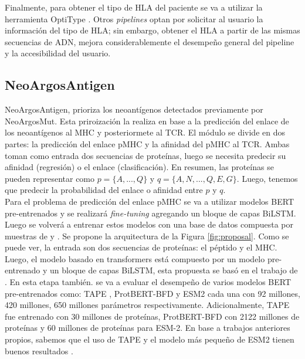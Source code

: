 \documentclass[a4paper]{article}
\begin{document}
Finalmente, para obtener el tipo de HLA del paciente se va a utilizar la herramienta OptiType \citep{szolek2014optitype}. Otros \textit{pipelines} optan por solicitar al usuario la información del tipo de HLA; sin embargo, obtener el HLA a partir de las mismas secuencias de ADN, mejora considerablemente el desempeño general del pipeline y la accesibilidad del usuario.




\subsection{NeoArgosAntigen}

NeoArgosAntigen, prioriza los neoantígenos detectados previamente por NeoArgosMut. Esta priroización la realiza en base a la predicción del enlace de los neoantígenos al MHC y posteriormete al TCR. El módulo se divide en dos partes: la predicción del enlace pMHC y la afinidad del pMHC al TCR. Ambas toman como entrada dos secuencias de proteínas, luego se necesita predecir su afinidad (regresión) o el enlace (clasificación). En resumen, las proteínas se pueden representar como $p = \{ A, ... , Q \}$ y $q = \{ A, N, ... ,Q, E, G \}$. Luego, tenemos que  predecir la probabilidad del enlace o afinidad entre $p$ y $q$. \\


Para el problema de predicción del enlace pMHC se va a utilizar modelos BERT pre-entrenados y se realizará \textit{fine-tuning} agregando un bloque de capas BiLSTM. Luego se volverá a entrenar estos modelos con una base de datos compuesta por muestras de \cite{zhang2022hlab} y \cite{gfeller2023improved}. Se propone la arquitectura de la Figura \ref{fig:proposal}. Como se puede ver, la entrada son dos secuencias de proteínas: el péptido y el MHC. Luego, el modelo basado en transformers está compuesto por un modelo pre-entrenado y un bloque de capas BiLSTM, esta propuesta se basó en el trabajo de \cite{zhang2022hlab}. En esta etapa también. se va a evaluar el desempeño de varios modelos BERT pre-entrenados como: TAPE \citep{rao2019evaluating}, ProtBERT-BFD \citep{elnaggar2021prottrans} y ESM2 \citep{lin2023evolutionary} cada una con 92 millones, 420 millones, 650 millones parámetros respectivamente. Adicionalmente, TAPE fue entrenado con 30 millones de proteínas, ProtBERT-BFD con 2122 millones de proteínas y 60 millones de proteínas para ESM-2. En base a trabajos anteriores propios, sabemos que el uso de TAPE y el modelo más pequeño de ESM2 tienen buenos resultados \citep{arceda2023neoantigen}.\\
\end{document}
